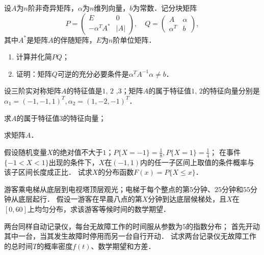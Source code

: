 \documentclass[plain,noanswer,medmath]{../../template/jnuexam}
\begin{document}

\begin{problem}
设$A$为$n$阶非奇异矩阵，$\alpha$为$n$维列向量，$b$为常数．记分块矩阵
$$P = \begin{pmatrix}
              E & 0 \\
  -\alpha^T A^* & |A|
\end{pmatrix},\quad
Q = \begin{pmatrix}
         A & \alpha \\
  \alpha^T & b
\end{pmatrix},$$
其中$A^*$是矩阵$A$的伴随矩阵，$E$为$n$阶单位矩阵．
\begin{enumerate}
\item 计算并化简$PQ$；
\item 证明：矩阵$Q$可逆的充分必要条件是$\alpha^T A^{-1}\alpha \ne b$．
\end{enumerate}
\end{problem}



\begin{problem}
设三阶实对称矩阵$A$的特征值是$1$, $2$ ,$3$；矩阵$A$的属于特征值$1$, $2$的特征向量分别是
$\alpha_1 = (- 1, - 1,1)^T,\alpha_2 = (1, - 2, - 1)^T$．\par
\begin{enumerate*}
\item 求$A$的属于特征值$3$的特征向量；
\item 求矩阵$A$．
\end{enumerate*}
\end{problem}



\begin{problem}
假设随机变量$X$的绝对值不大于$1$；$P\{X = - 1\} = \frac{1}{8},P\{X = 1\} = \frac{1}{4}$；
在事件$\{- 1 < X < 1\}$出现的条件下，$X$在$(- 1,1)$内的任一子区间上取值的条件概率与该子区间长度成正比．
试求$X$的分布函数$F(x) = P\{X \le x\}$．
\end{problem}



\begin{problem}
游客乘电梯从底层到电视塔顶层观光；电梯于每个整点的第$5$分钟、$25$分钟和$55$分钟从底层起行．
假设一游客在早晨八点的第$X$分钟到达底层候梯处，且$X$在$[0,60]$上均匀分布，求该游客等候时间的数学期望．
\end{problem}



\begin{problem}
两台同样自动记录仪，每台无故障工作的时间服从参数为$5$的指数分布；
首先开动其中一台，当其发生故障时停用而另一台自行开动．
试求两台记录仪无故障工作的总时间$T$的概率密度$f(t)$、数学期望和方差．
\end{problem}
\end{document}
